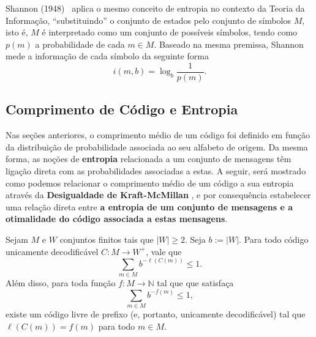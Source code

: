 Shannon (1948)~\cite{Shan} aplica o mesmo conceito de entropia no contexto da Teoria da Informação, ``substituindo'' o conjunto de estados pelo conjunto de símbolos $M$, isto é, $M$ é interpretado como um conjunto de possíveis símbolos, tendo como $p(m)$ a probabilidade de cada $m \in M$.
Baseado na mesma premissa, Shannon mede a informação de cada símbolo da seguinte forma
\begin{equation} \label{label:info_quantity}
i(m,b) = \log_b \frac{1}{p(m)}.
\end{equation}

\subsection{Comprimento de Código e Entropia}
Nas seções anteriores, o comprimento médio de um código  foi definido em função da distribuição de probabilidade associada ao seu alfabeto de origem.
Da mesma forma, as noções de \textbf{entropia} relacionada a um conjunto de mensagens têm ligação direta com as probabilidades associadas a estas. 
A seguir, será mostrado como podemos relacionar o comprimento médio de um código a sua entropia através da \textbf{Desigualdade de Kraft-McMillan} , e por consequência estabelecer uma relação direta entre \textbf{a entropia de um conjunto de mensagens e a otimalidade do código associada a estas mensagens}.

\begin{theorem}
  \label{thm:kraftmc}
  Sejam $M$ e $W$ conjuntos finitos tais que $|W|\geq 2$. Seja $b :=
  |W|$. Para todo código unicamente decodificável $C: M \to W^+$, vale
  que
  \begin{equation}
    \label{eq:cond_kraft_nec}
    \sum_{m\in M} b^{-\ell(C(m))} \leq 1.
  \end{equation}
  Além disso, para toda função $f: M\to\mathbb{N}$ tal que
  que satisfaça
  \begin{equation}
    \label{eq:cond_kraft_suf}
    \sum_{m \in M} b^{-f(m)} \leq 1,
  \end{equation}
  existe um código livre de prefixo (e, portanto, unicamente
  decodificável) tal que $\ell(C(m)) = f(m)$ para todo $m\in M$.
\end{theorem}

